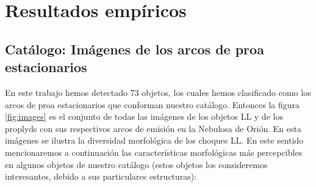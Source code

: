 %



%


\label{chap:results}

\section{Resultados empíricos}
\label{sec:results-1}

\subsection{Catálogo: Imágenes de los arcos de proa estacionarios}
\label{sec:images}


En este trabajo hemos detectado 73 objetos, los cuales hemos clasificado como los arcos de proa estacionarios que conforman nuestro catálogo. Entonces la  figura \ref{fig:images} es el conjunto de todas las imágenes de los objetos LL y de los proplyds con sus respectivos arcos de emisión en la Nebulosa de Orión. En esta imágenes se ilustra la diversidad morfológica de los choques LL. En este sentido mencionaremos a continuación  las características morfológicas más percepcibles en algunos objetos de nuestro catálogo (estos objetos los consideremos interesantes, debido a sus particulares estructuras):\\

